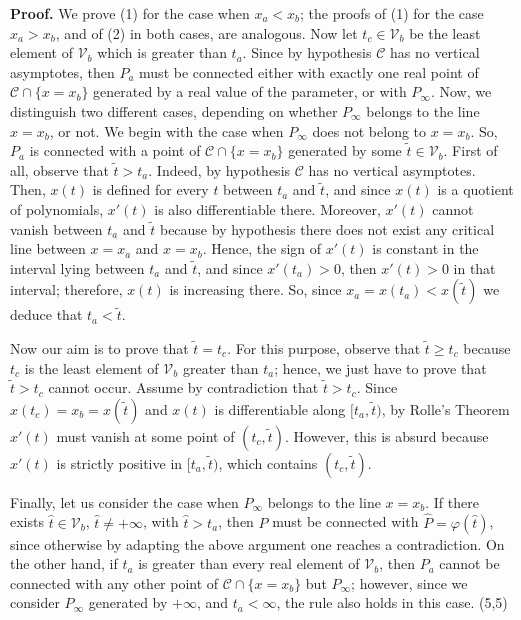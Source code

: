 \documentclass{elsart}
\def\qed{\hfill  \framebox(5,5){}}
\begin{document}
{\bf Proof.} We prove (1) for the case when $x_a< x_b$; the proofs
of (1) for the case $x_a>x_b$, and of (2) in both cases, are
analogous. Now let $t_c\in {\mathcal V}_b$ be the least element of
${\mathcal V}_b$ which is greater than $t_a$. Since by hypothesis
${\mathcal C}$ has no vertical asymptotes, then $P_a$ must be
connected either with exactly one real point of ${\mathcal C}\cap
\{x=x_b\}$ generated by a real value of the parameter, or with
$P_{\infty}$. Now, we distinguish two different cases, depending
on whether $P_{\infty}$ belongs to the line $x=x_b$, or not. We
begin with the case when $P_{\infty}$ does not belong to $x=x_b$.
So, $P_a$ is connected with a point of ${\mathcal C}\cap
\{x=x_b\}$ generated by some $\tilde{t}\in {\mathcal V}_b$. First of
all, observe that $\tilde{t}>t_a$. Indeed, by hypothesis
${\mathcal C}$ has no vertical asymptotes. Then, $x(t)$ is defined
for every $t$ between $t_a$ and $\tilde{t}$, and since $x(t)$
is a quotient of polynomials, $x'(t)$ is also differentiable
there. Moreover, $x'(t)$ cannot vanish between $t_a$ and
$\tilde{t}$ because by hypothesis there does not exist any
critical line between $x=x_a$ and $x=x_b$. Hence, the sign of
$x'(t)$ is constant in the interval lying between $t_a$ and
$\tilde{t}$, and since $x'(t_a)>0$, then $x'(t)>0$ in that interval; therefore,
$x(t)$ is increasing there. So, since $x_a=x(t_a)<x(\tilde{t})$
we deduce that $t_a<\tilde{t}$.

Now our aim is to prove that $\tilde{t}=t_c$. For this purpose,
 observe that $\tilde{t}\geq t_c$ because $t_c$ is
the least element of ${\mathcal V}_b$ greater than $t_a$; hence,
we just have to prove that $\tilde{t}>t_c$ cannot occur. Assume by
contradiction that $\tilde{t}>t_c$. Since
$x(t_c)=x_b=x(\tilde{t})$ and $x(t)$ is differentiable along
$[t_a,\tilde{t})$, by Rolle's Theorem $x'(t)$ must vanish at some
point of $(t_c,\tilde{t})$. However, this is absurd because
$x'(t)$ is strictly positive in $[t_a,\tilde{t})$, which contains
$(t_c,\tilde{t})$.

Finally, let
us consider the case when $P_{\infty}$ belongs to the line
$x=x_b$. If there exists $\hat{t}\in {\mathcal V}_b$, $\hat{t}\neq
+\infty$, with $\hat{t}>t_a$, then $P$ must be connected with
$\hat{P}=\varphi(\hat{t})$, since otherwise by adapting the above
argument one reaches a
contradiction. On the other hand,
if $t_a$ is greater than every real element of ${\mathcal V}_b$,
then $P_a$ cannot be connected with any other point of ${\mathcal
C}\cap \{x=x_b\}$ but $P_{\infty}$; however, since we consider
$P_{\infty}$ generated by $+\infty$, and $t_a<\infty$, the rule also
holds in this case. \qed
\end{document}
